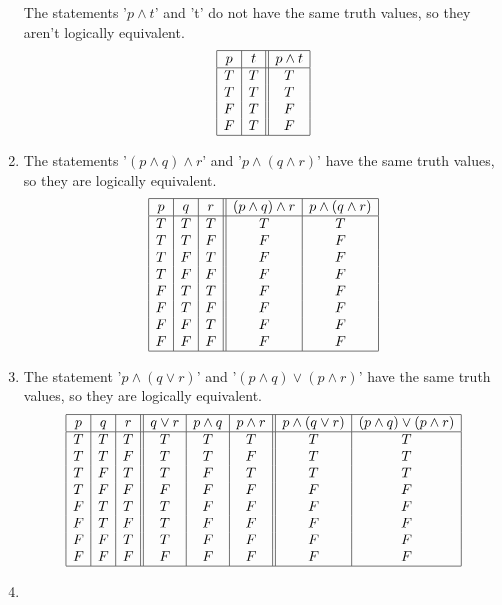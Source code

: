 \documentclass{article}
\begin{document}
\begin{enumerate}[label=\textbf{\arabic*.}]
The statements '$p \land t$' and 't' do not have the same truth values, so they aren't logically equivalent.
\[
\begin{array}{|c|c||c|}
\hline
p & t & p \land t\\
\hline
T & T & T \\
T & T & T \\
F & T & F \\
F & T & F \\
\hline 
\end{array}
\]
\item %
The statements '$(p \land q) \land r$' and '$p \land (q \land r)$' have the same truth values, so they are logically equivalent.
\[
\begin{array}{|c|c|c||c|c|}
\hline
p & q & r & (p \land q) \land r & p \land (q \land r)\\
\hline
T & T & T & T & T \\
T & T & F & F & F \\
T & F & T & F & F \\
T & F & F & F & F \\
F & T & T & F & F \\
F & T & F & F & F \\
F & F & T & F & F \\
F & F & F & F & F \\
\hline 
\end{array}
\]
\item %
The statement '$p \land (q \lor r)$' and '$(p \land q) \lor (p \land r)$' have the same truth values, so they are logically equivalent.
\[
\begin{array}{|c|c|c||c|c|c||c|c|}
\hline
p & q & r & q \lor r & p \land q & p \land r & p \land (q \lor r) & (p \land q) \lor (p \land r)\\
\hline
T & T & T & T & T & T & T & T \\
T & T & F & T & T & F & T & T \\
T & F & T & T & F & T & T & T \\
T & F & F & F & F & F & F & F \\
F & T & T & T & F & F & F & F \\
F & T & F & T & F & F & F & F \\
F & F & T & T & F & F & F & F \\
F & F & F & F & F & F & F & F \\
\hline 
\end{array}
\]
\item %

\end{enumerate}
\end{document}
